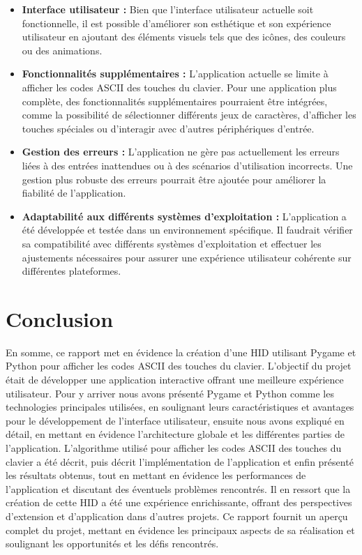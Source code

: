 \documentclass[12pt,a4paper]{report}
\begin{document}
\begin{itemize}
    \item {\bfseries Interface utilisateur :} Bien que l'interface utilisateur actuelle soit fonctionnelle, il est possible d'améliorer son esthétique et son expérience utilisateur en ajoutant des éléments visuels tels que des icônes, des couleurs ou des animations.\\
    \item {\bfseries Fonctionnalités supplémentaires :} L'application actuelle se limite à afficher les codes ASCII des touches du clavier. Pour une application plus complète, des fonctionnalités supplémentaires pourraient être intégrées, comme la possibilité de sélectionner différents jeux de caractères, d'afficher les touches spéciales ou d'interagir avec d'autres périphériques d'entrée.\\

   \item {\bfseries Gestion des erreurs :} L'application ne gère pas actuellement les erreurs liées à des entrées inattendues ou à des scénarios d'utilisation incorrects. Une gestion plus robuste des erreurs pourrait être ajoutée pour améliorer la fiabilité de l'application.\\

   \item {\bfseries Adaptabilité aux différents systèmes d'exploitation :} L'application a été développée et testée dans un environnement spécifique. Il faudrait vérifier sa compatibilité avec différents systèmes d'exploitation et effectuer les ajustements nécessaires pour assurer une expérience utilisateur cohérente sur différentes plateformes.\\
\end{itemize}

\newpage
\section{Conclusion}

En somme, ce rapport met en évidence la création d'une HID utilisant Pygame et Python pour afficher les codes ASCII des touches du clavier. L'objectif du projet était de développer une application interactive offrant une meilleure expérience utilisateur. Pour y arriver nous avons présenté Pygame et Python comme les technologies principales utilisées, en soulignant leurs caractéristiques et avantages pour le développement de l'interface utilisateur, ensuite nous avons expliqué en détail, en mettant en évidence l'architecture globale et les différentes parties de l'application. L'algorithme utilisé pour afficher les codes ASCII des touches du clavier a été décrit, puis décrit l'implémentation de l'application et enfin présenté les résultats obtenus, tout en mettant en évidence les performances de l'application et discutant des éventuels problèmes rencontrés. Il en ressort que la création de cette HID a été une expérience enrichissante, offrant des perspectives d'extension et d'application dans d'autres projets. Ce rapport fournit un aperçu complet du projet, mettant en évidence les principaux aspects de sa réalisation et soulignant les opportunités et les défis rencontrés.
\end{document}
